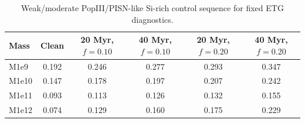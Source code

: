 \begin{table}
\caption{Weak/moderate PopIII/PISN-like Si-rich control sequence for fixed ETG diagnostics.}
\label{tab:weakmod_etg_sequence}
\centering
\begin{tabular}{lccccc}
\toprule
Mass & Clean & 20 Myr, $f=0.10$ & 40 Myr, $f=0.10$ & 20 Myr, $f=0.20$ & 40 Myr, $f=0.20$ \\
\midrule
M1e9  & 0.192 & 0.246 & 0.277 & 0.293 & 0.347 \\
M1e10 & 0.147 & 0.178 & 0.197 & 0.207 & 0.242 \\
M1e11 & 0.093 & 0.113 & 0.126 & 0.132 & 0.155 \\
M1e12 & 0.074 & 0.129 & 0.160 & 0.175 & 0.229 \\
\bottomrule
\end{tabular}
\end{table}
